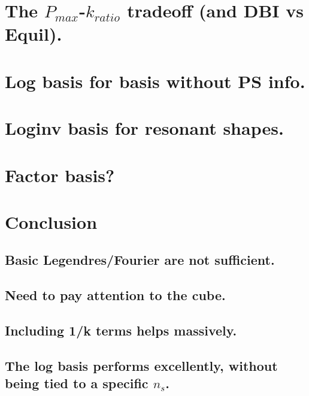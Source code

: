 \section{The $P_{max}$-$k_{ratio}$ tradeoff (and DBI vs Equil).}
\section{Log basis for basis without PS info.}
\section{Loginv basis for resonant shapes.}
\section{Factor basis?}
\section{Conclusion}
    \subsection{Basic Legendres/Fourier are not sufficient.}
    \subsection{Need to pay attention to the cube.}
    \subsection{Including 1/k terms helps massively.}
    \subsection{The log basis performs excellently, without being tied to a specific $n_s$.}
